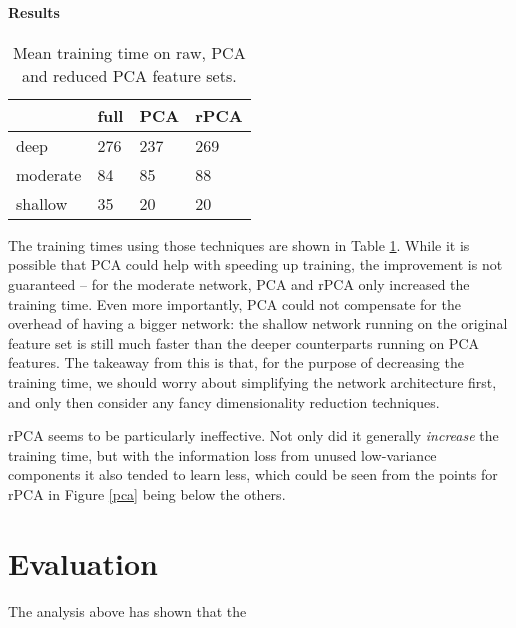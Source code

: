 \documentclass[10pt, twocolumn]{article}
\begin{document}
\paragraph{Results} 
\begin{table}[]
	\begin{tabularx}{\linewidth}{XXXX}
		\hline
				& \textbf{full} & \textbf{PCA} & \textbf{rPCA}\\ \hline
		deep    & 276   & 237  & 269 \\
		moderate  & 84 & 85 & 88 \\
		shallow & 35 & 20 & 20
		\end{tabularx}
\caption{Mean training time on raw, PCA and reduced PCA feature sets.}\label{g2}
\end{table}


The training times using those techniques are shown in Table \ref{g2}. While it is possible that PCA could help with speeding up training, the improvement is not guaranteed – for the moderate network, PCA and rPCA only increased the training time. Even more importantly, PCA could not compensate for the overhead of having a bigger network: the shallow network running on the original feature set is still much faster than the deeper counterparts running on PCA features. The takeaway from this is that, for the purpose of decreasing the training time, we should worry about simplifying the network architecture first, and only then consider any fancy dimensionality reduction techniques.



rPCA seems to be particularly ineffective. Not only did it generally \textit{increase} the training time, but with the information loss from unused low-variance components it also tended to learn less, which could be seen from the points for rPCA in Figure \ref{pca} being below the others.



\section{Evaluation}
The analysis above has shown that the 


\medskip
 


\end{document}
